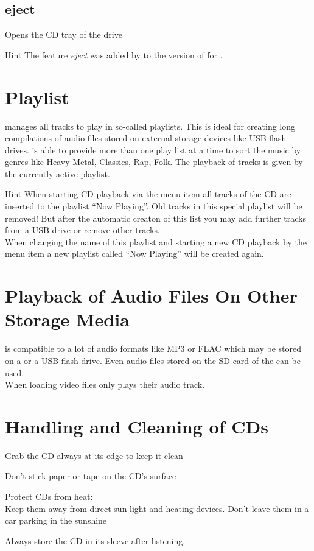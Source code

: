 \subsection*{eject}
Opens the CD tray of the drive
\begin{bclogo}[logo = \bclampe, noborder = true]{Hint}
The feature \textit{eject} was added by {\autor} to the {\RPi} version
of {\audacious} for {\Bezeichnung}.
\end{bclogo}


\section{Playlist}
\label{sect:playlist}
{\audacious} manages all tracks to play in so-called playlists. This is
ideal for creating long compilations of audio files stored on external
storage devices like USB flash drives. {\audacious} is able to provide 
more than one play list at a time to sort the music by genres like
Heavy Metal, Classics, Rap, Folk. The playback of tracks is given by the
currently active playlist.
\begin{bclogo}[logo = \bclampe, noborder = true]{Hint} 
When starting CD playback via the menu item 
 all tracks of the CD are 
inserted to the playlist ``Now Playing''. Old tracks in this special 
playlist will be removed! But after the automatic creaton of this list 
you may add further tracks from a USB drive or remove other tracks.\\
When changing the name of this playlist and starting a new CD playback
by the menu item  a new playlist
called ``Now Playing'' will be created again.
\end{bclogo}


\section{Playback of Audio Files On Other Storage Media}
{\audacious} is compatible to a lot of audio formats like MP3 or FLAC
which may be stored on a {\CDROM} or a USB flash drive. Even audio files 
stored on the SD card of the {\RPi} can be used.\\
When loading video files {\audacious} only plays their audio track.


\section{Handling and Cleaning of CDs}
\begin{compactitem}
\item{Grab the CD always at its edge to keep it clean}
\item{Don't stick paper or tape on the CD's surface}
\item{Protect CDs from heat:\\Keep them away from direct sun light and heating devices. Don't leave them in a car parking in the sunshine}
\item{Always store the CD in its sleeve after listening.}
\end{compactitem}

